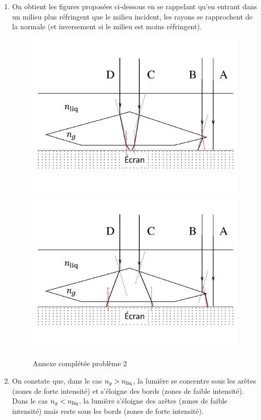 \documentclass[a4paper, 11pt, garamond, oneside]{book}
\begin{document}
{}{
	\begin{enumerate}
		\item On obtient les figures proposées ci-dessous en se rappelant qu'en
		      entrant dans un milieu plus réfringent que le milieu incident, les
		      rayons se rapprochent de la normale (et inversement si le milieu est
		      moins réfringent).
		      \begin{figure}[htbp]
			      \centering
			      {\includegraphics[width=.7\linewidth]{gemme_c1}}
			      {\includegraphics[width=.7\linewidth]{gemme_c2}}
			      \caption{Annexe complétée problème 2}
		      \end{figure}
		\item On constate que, dans le cas $n_g>n_{\rm liq}$, la lumière se
		      concentre sous les arêtes (zones de forte intensité) et s'éloigne des
		      bords (zones de faible intensité). Dans le cas $n_g<n_{\rm liq}$,
		      la lumière s'éloigne des arêtes (zones de faible intensité) mais reste
		      sous les bords (zones de forte intensité).
		      \smallbreak
		      \smallbreak
	\end{enumerate}
}
\end{document}
